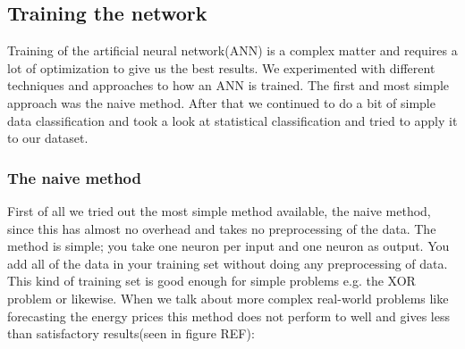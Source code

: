 

\subsection{Training the network}
Training of the artificial neural network(ANN) is a complex matter and requires a lot of optimization to give us the best results. We experimented with different techniques and approaches to how an ANN is trained. The first and most simple approach was the naive method. After that we continued to do a bit of simple data classification and took a look at statistical classification and tried to apply it to our dataset.
\subsubsection{The naive method}
First of all we tried out the most simple method available, the naive method, since this has almost no overhead and takes no preprocessing of the data. The method is simple; you take one neuron per input and one neuron as output. You add all of the data in your training set without doing any preprocessing of data. This kind of training set is good enough for simple problems e.g. the XOR problem or likewise. When we talk about more complex real-world problems like forecasting the energy prices this method does not perform to well and gives less than satisfactory results(seen in figure REF):

\begin{table}[!ht]\footnotesize
\centering  %
\caption{Results from the naive training approach.} %
\label{table:naiveTrainingApproach} %
\end{table}

